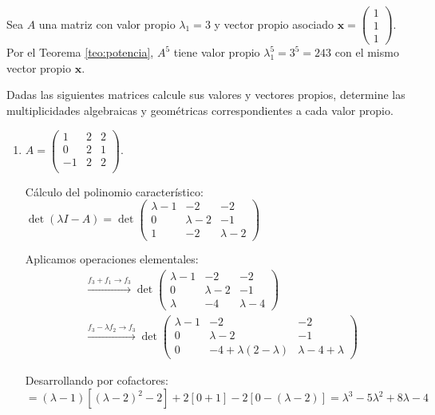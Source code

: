 \begin{example}
Sea $A$ una matriz con valor propio $\lambda_1 = 3$ y vector propio asociado $\mathbf{x} = \begin{pmatrix} 1 \\ 1 \\ 1 \end{pmatrix}$. Por el Teorema \ref{teo:potencia}, $A^5$ tiene valor propio $\lambda_1^5 = 3^5 = 243$ con el mismo vector propio $\mathbf{x}$.
\end{example}


\begin{prob}\label{prob:vvp} Dadas las siguientes matrices calcule sus valores y vectores propios, determine las multiplicidades algebraicas y geométricas correspondientes a cada valor propio.  
  \begin{enumerate}[$a)$]
  \item $A=\left( \begin{array}{ccc} 
	1&2&2 \\
	0&2&1\\
	-1&2&2\\
	\end{array} \right).$ 
\begin{myproof}
Cálculo del polinomio característico: \(
\det(\lambda I - A) = \det\begin{pmatrix}
\lambda-1 & -2 & -2 \\
0 & \lambda-2 & -1 \\
1 & -2 & \lambda-2
\end{pmatrix}
\)

Aplicamos operaciones elementales:
\begin{align*}
& \xrightarrow{f_3 + f_1 \to f_3} \det\begin{pmatrix}
\lambda-1 & -2 & -2 \\
0 & \lambda-2 & -1 \\
\lambda & -4 & \lambda-4
\end{pmatrix} \\
& \xrightarrow{f_3 - \lambda f_2 \to f_3} \det\begin{pmatrix}
\lambda-1 & -2 & -2 \\
0 & \lambda-2 & -1 \\
0 & -4 + \lambda(2-\lambda) & \lambda-4 + \lambda
\end{pmatrix}
\end{align*}

Desarrollando por cofactores:
\[
= (\lambda-1)\left[(\lambda-2)^2 - 2\right] + 2\left[0 + 1\right] - 2\left[0 - (\lambda-2)\right] = \lambda^3 - 5\lambda^2 + 8\lambda - 4
\]


\end{myproof}
\end{enumerate}
\end{prob}
